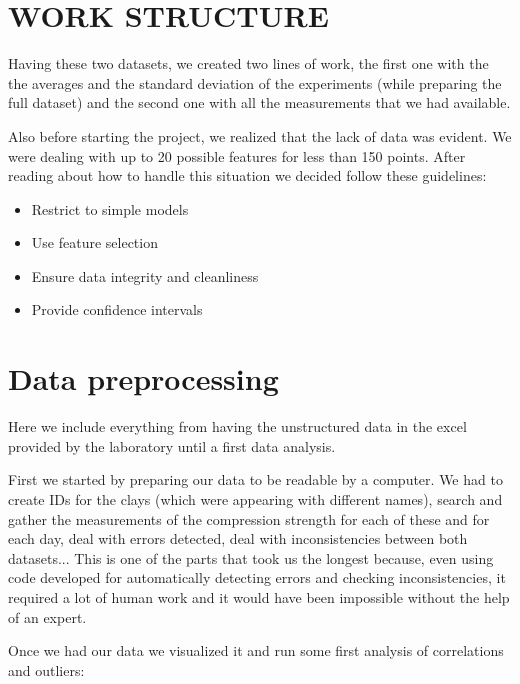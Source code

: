 \documentclass[10pt,conference,compsocconf]{IEEEtran}
\begin{document}
\section{WORK STRUCTURE}


Having these two datasets, we created two lines of work, the first one with the the averages and the standard deviation of the experiments (while preparing the full dataset) and the second one with all the measurements that we had available.

Also before starting the project, we realized that the lack of data was evident. We were dealing with up to 20 possible features for less than 150 points. After reading about how to handle this situation we decided follow these guidelines:
\begin{itemize}
    \item Restrict to simple models
    \item Use feature selection
    \item Ensure data integrity and cleanliness
    \item Provide confidence intervals
\end{itemize}

\section{Data preprocessing}


Here we include everything from having the unstructured data in the excel provided by the laboratory until a first data analysis.

First we started by preparing our data to be readable by a computer. We had to create IDs for the clays (which were appearing with different names), search and gather the measurements of the compression strength for each of these and for each day, deal with errors detected, deal with inconsistencies between both datasets... This is one of the parts that took us the longest because, even using code developed for automatically detecting errors and checking inconsistencies, it required a lot of human work and it would have been impossible without the help of an expert.

Once we had our data we visualized it and run some first analysis of correlations and outliers:
\end{document}
